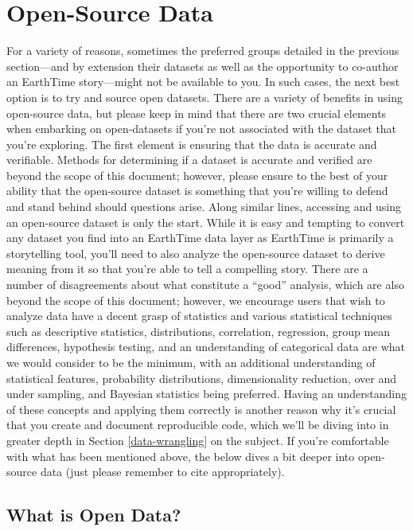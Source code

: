 \documentclass[
]{krantz}
\begin{document}
\hypertarget{open-source-data}{%
\section{Open-Source Data}\label{open-source-data}}

For a variety of reasons, sometimes the preferred groups detailed in the previous section---and by extension their datasets as well as the opportunity to co-author an EarthTime story---might not be available to you. In such cases, the next best option is to try and source open datasets. There are a variety of benefits in using open-source data, but please keep in mind that there are two crucial elements when embarking on open-datasets if you're not associated with the dataset that you're exploring. The first element is ensuring that the data is accurate and verifiable. Methods for determining if a dataset is accurate and verified are beyond the scope of this document; however, please ensure to the best of your ability that the open-source dataset is something that you're willing to defend and stand behind should questions arise. Along similar lines, accessing and using an open-source dataset is only the start. While it is easy and tempting to convert any dataset you find into an EarthTime data layer as EarthTime is primarily a storytelling tool, you'll need to also analyze the open-source dataset to derive meaning from it so that you're able to tell a compelling story. There are a number of disagreements about what constitute a ``good'' analysis, which are also beyond the scope of this document; however, we encourage users that wish to analyze data have a decent grasp of statistics and various statistical techniques such as descriptive statistics, distributions, correlation, regression, group mean differences, hypothesis testing, and an understanding of categorical data are what we would consider to be the minimum, with an additional understanding of statistical features, probability distributions, dimensionality reduction, over and under sampling, and Bayesian statistics being preferred. Having an understanding of these concepts and applying them correctly is another reason why it's crucial that you create and document reproducible code, which we'll be diving into in greater depth in Section \ref{data-wrangling} on the subject. If you're comfortable with what has been mentioned above, the below dives a bit deeper into open-source data (just please remember to cite appropriately).

\hypertarget{what-is-open-data}{%
\subsection*{What is Open Data?}\label{what-is-open-data}}
\end{document}
